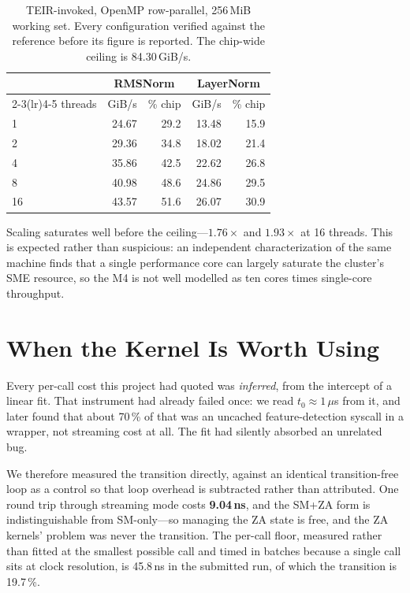 \documentclass[conference,10pt]{IEEEtran}
\begin{document}
\begin{table}[t]
\caption{TEIR-invoked, OpenMP row-parallel, 256\,MiB working set. Every
configuration verified against the reference before its figure is reported. The
chip-wide ceiling is 84.30\,GiB/s.}
\label{tab:threading}
\centering
\begin{tabular}{lrrrr}
\toprule
& \multicolumn{2}{c}{RMSNorm} & \multicolumn{2}{c}{LayerNorm} \\
\cmidrule(lr){2-3}\cmidrule(lr){4-5}
threads & GiB/s & \% chip & GiB/s & \% chip \\
\midrule
1  & 24.67 & 29.2 & 13.48 & 15.9 \\
2  & 29.36 & 34.8 & 18.02 & 21.4 \\
4  & 35.86 & 42.5 & 22.62 & 26.8 \\
8  & 40.98 & 48.6 & 24.86 & 29.5 \\
16 & 43.57 & 51.6 & 26.07 & 30.9 \\
\bottomrule
\end{tabular}
\end{table}

Scaling saturates well before the ceiling---$1.76\times$ and $1.93\times$ at 16
threads. This is expected rather than suspicious: an independent
characterization of the same machine finds that a single performance core can
largely saturate the cluster's SME resource, so the M4 is not well modelled as
ten cores times single-core throughput.

\section{When the Kernel Is Worth Using}
\label{sec:crossover}

Every per-call cost this project had quoted was \emph{inferred}, from the
intercept of a linear fit. That instrument had already failed once: we read
$t_0\approx1\,\mu$s from it, and later found that about 70\,\% of that was an
uncached feature-detection syscall in a wrapper, not streaming cost at all. The
fit had silently absorbed an unrelated bug.

We therefore measured the transition directly, against an identical
transition-free loop as a control so that loop overhead is subtracted rather
than attributed. One round trip through streaming mode costs \textbf{9.04\,ns},
and the SM+ZA form is indistinguishable from SM-only---so managing the ZA state
is free, and the ZA kernels' problem was never the transition. The per-call
floor, measured rather than fitted at the smallest possible call and timed in
batches because a single call sits at clock resolution, is 45.8\,ns in the
submitted run, of which the transition is 19.7\,\%.
\end{document}
